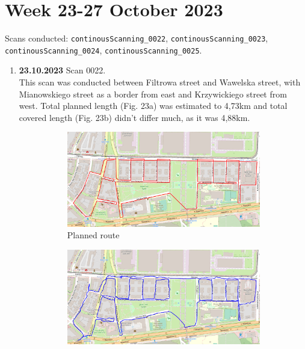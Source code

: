 \documentclass[a4paper,12pt]{book}
\begin{document}
\section{Week 23-27 October 2023}
Scans conducted: \verb|continousScanning_0022|, \verb|continousScanning_0023|, \verb|continousScanning_0024|, \verb|continousScanning_0025|.\\
\begin{enumerate}
	\item \textbf{23.10.2023} Scan 0022. \\
	This scan was conducted between Filtrowa street and Wawelska street, with Mianowskiego street as a border from east and Krzywickiego street from west. Total planned length (Fig. 23a) was estimated to 4,73km and total covered length (Fig. 23b) didn't differ much, as it was 4,88km.
	\pagebreak
	\begin{figure}[H]
		\centering
		\begin{subfigure}{.90\textwidth}
			\centering
			\includegraphics[width=1\linewidth]{route_p22}
			\caption{Planned route}
			\label{fig:a22}
		\end{subfigure}%
		\linebreak
		\begin{subfigure}{.90\textwidth}
			\centering
			\includegraphics[width=1\linewidth]{route_c22}

\end{subfigure}
\end{figure}
\end{enumerate}
\end{document}

